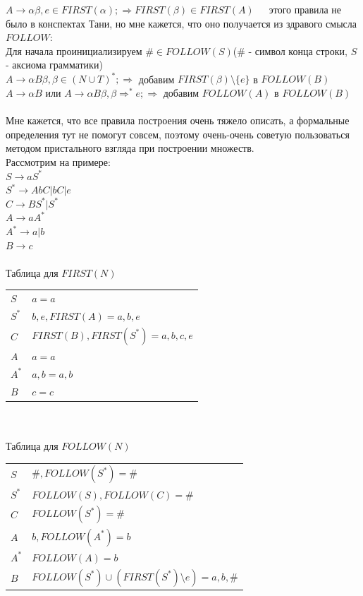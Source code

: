 \documentclass[14pt]{extreport}
\begin{document}
	\hspace*{30pt} $A \to \alpha \beta, e \in FIRST(\alpha); \Rightarrow FIRST(\beta)
	\in FIRST(A)$\ \ \ этого правила не было в
	\hspace*{30pt} конспектах Тани, но мне кажется, что оно получается из здравого смысла\\
	$FOLLOW$:\\
	\hspace*{30pt}Для начала проинициализируем $\# \in FOLLOW(S)$(\# - символ конца строки,
	\hspace*{30pt}$S$ - аксиома грамматики)\\
	\hspace*{30pt}$A \to \alpha B \beta, \beta \in (N \cup T)^*; \Rightarrow$ добавим
	$FIRST(\beta) \setminus \{e\}$ в $FOLLOW(B)$\\
	\hspace*{30pt}$A \to \alpha B$ или $A \to \alpha B \beta, \beta \Rightarrow ^* e;
	\Rightarrow$ добавим $FOLLOW(A)$ в $FOLLOW(B)$\\\\
	Мне кажется, что все правила построения очень тяжело описать, а формальные определения
	тут не помогут совсем, поэтому очень-очень советую пользоваться методом пристального
	взгляда при построении множеств.\\
	Рассмотрим на примере:\\
	$S \to aS^*$\\
	$S^* \to AbC | bC | e$\\
	$C \to BS^* | S^*$\\
	$A \to aA^*$\\
	$A^* \to a|b$\\
	$B \to c$\\\\
	Таблица для $FIRST(N)$ \\
	\begin{tabular}{ll}
			 $S$ & $a=a$ \\
			 $S^*$ & $b,e,FIRST(A)=a,b,e$ \\
			 $C$ & $FIRST(B),FIRST(S^*)=a,b,c,e$ \\
			 $A$ & $a=a$ \\
			 $A^*$ & $a,b=a,b$ \\
			 $B$ & $c=c$ \\
	\end{tabular}\\\\
	\newpage
	Таблица для $FOLLOW(N)$ \\
	\begin{tabular}{ll}
			 $S$ & $\#,FOLLOW(S^*)=\#$ \\
			 $S^*$ & $FOLLOW(S),FOLLOW(C)=\#$ \\
			 $C$ & $FOLLOW(S^*)=\#$ \\
			 $A$ & $b,FOLLOW(A^*)=b$ \\
			 $A^*$ & $FOLLOW(A)=b$ \\
			 $B$ & $FOLLOW(S^*) \cup (FIRST(S^*) \setminus e)=a,b,\#$ \\
	\end{tabular}\\\\
\end{document}

